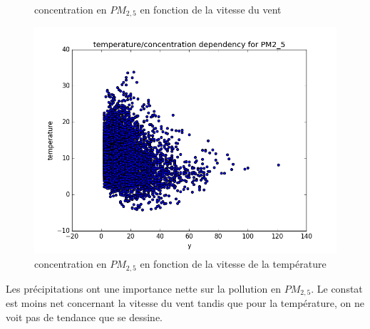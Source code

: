 \begin{figure}[H]
  \caption{concentration en $PM_{2,5}$ en fonction de la vitesse du vent}
	\endminipage\hfill
	\includegraphics[width=\linewidth]{images/PM2_5_temp_y.png}
  \caption{concentration en $PM_{2,5}$ en fonction de la vitesse de la température}
	\endminipage\hfill
\end{figure}
Les précipitations ont une importance nette sur la pollution en $PM_{2,5}$.
Le constat est moins net concernant la vitesse du vent tandis que pour la température, on ne voit pas de tendance que se dessine.

